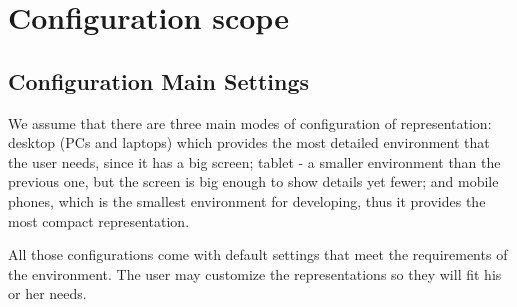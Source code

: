 \section{Configuration scope}
\subsection{Configuration Main Settings}
We assume that there are three main modes of configuration of representation: desktop (PCs and laptops) which provides the most detailed environment that the user needs, since it has a big screen; tablet - a smaller environment than the previous one, but the screen is big enough to show details yet fewer; and mobile phones, which is the smallest environment for developing, thus it provides the most compact representation. 

All those configurations come with default settings that meet the requirements of the environment. The user may customize the representations so they will fit his or her needs.
